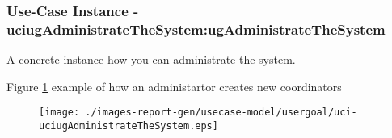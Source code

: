 
	\subsubsection{Use-Case Instance - uciugAdministrateTheSystem:ugAdministrateTheSystem}
	
	A concrete instance how you can administrate the system.		  
	\begin{operationmodel}
	
	\end{operationmodel} 

	
	Figure \ref{fig:lu.uni.lassy.excalibur.MyCrash.G02-RE-UC-uci-uciugAdministrateTheSystem}
	example of how an administartor creates new coordinators
	
	\begin{figure}[htbp]
	\begin{center}
	
	\texttt{[image: ./images-report-gen/usecase-model/usergoal/uci-uciugAdministrateTheSystem.eps]}
	\end{center}
	\caption[lu.uni.lassy.excalibur.MyCrash.G02 Sequence Diagram: uci-uciugAdministrateTheSystem]{}
	\label{fig:lu.uni.lassy.excalibur.MyCrash.G02-RE-UC-uci-uciugAdministrateTheSystem}
	\end{figure}
	\vspace{0.5cm}
